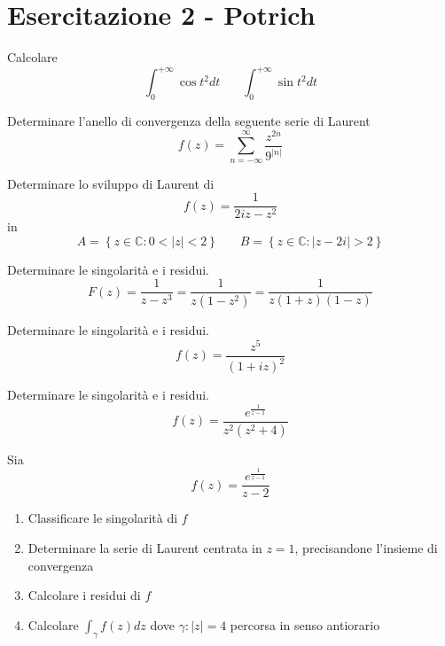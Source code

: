 \chapter{Esercitazione 2 - Potrich}
\ParteEsercizi
{}

Calcolare
\begin{equation*}
\int\nolimits ^{+\infty }_{0}\cos t^{2} dt\ \ \ \ \ \ \ \ \int\nolimits ^{+\infty }_{0}\sin t^{2} dt
\end{equation*}
\Esercizio{}

Determinare l'anello di convergenza della seguente serie di Laurent
\begin{equation*}
f\left( z\right) =\sum\limits ^{\infty }_{n=-\infty }\frac{z^{2n}}{9^{\left| n\right| }}
\end{equation*}
\Esercizio{}

Determinare lo sviluppo di Laurent di
\begin{equation*}
f\left( z\right) =\frac{1}{2iz-z^{2}}
\end{equation*}
in
\begin{equation*}
A=\left\{z\in \mathbb{C} :0< \left| z\right| < 2\right\} \ \ \ \ \ \ \ \ B=\left\{z\in \mathbb{C} :\left| z-2i\right|  >2\right\}
\end{equation*}
\Esercizio{}

Determinare le singolarità e i residui.
\begin{equation*}
F\left( z\right) =\frac{1}{z-z^{3}} =\frac{1}{z\left( 1-z^{2}\right)} =\frac{1}{z\left( 1+z\right)\left( 1-z\right)}
\end{equation*}
\Esercizio{}

Determinare le singolarità e i residui.
\begin{equation*}
f\left( z\right) =\frac{z^{5}}{\left( 1+iz\right)^{2}}
\end{equation*}
\Esercizio{}

Determinare le singolarità e i residui.
\begin{equation*}
f\left( z\right) =\frac{e^{\frac{1}{z-1}}}{z^{2}\left( z^{2} +4\right)}
\end{equation*}
\Esercizio{}

Sia
\begin{equation*}
f\left( z\right) =\frac{e^{\frac{1}{z-1}}}{z-2}
\end{equation*}
\begin{enumerate}
\item Classificare le singolarità di $f$
\item Determinare la serie di Laurent centrata in $z=1$, precisandone l'insieme di convergenza
\item Calcolare i residui di $f$
\item Calcolare $\int _{\gamma } f\left( z\right) dz$ dove $\gamma :\left| z\right| =4$ percorsa in senso antiorario
\end{enumerate}
\ParteSoluzioni
\Soluzione

